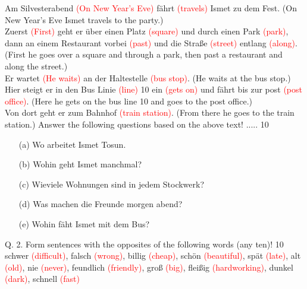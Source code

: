 \documentclass{article}
\begin{document}
Am Silvesterabend \textcolor{red}{(On New Year's Eve)} fährt \textcolor{red}{(travels)} Ismet zu dem Fest. (On New Year's Eve Ismet travels to the party.)\\
Zuerst \textcolor{red}{(First)} geht er über einen Platz \textcolor{red}{(square)} und durch einen Park \textcolor{red}{(park)}, dann an einem Restaurant vorbei \textcolor{red}{(past)} und die Straße \textcolor{red}{(street)} entlang \textcolor{red}{(along)}. (First he goes over a square and through a park, then past a restaurant and along the street.)\\
Er wartet \textcolor{red}{(He waits)} an der Haltestelle \textcolor{red}{(bus stop)}. (He waits at the bus stop.)\\
Hier steigt er in den Bus Linie \textcolor{red}{(line)} 10 ein \textcolor{red}{(gets on)} und fährt bis zur post \textcolor{red}{(post office)}. (Here he gets on the bus line 10 and goes to the post office.)\\
Von dort geht er zum Bahnhof \textcolor{red}{(train station)}. (From there he goes to the train station.)
Answer the following questions based on the above text! ..... 10
\begin{enumerate}
    \item[(a)] Wo arbeitet Ismet Tosun.
    \item[(b)] Wohin geht Ismet manchmal?
    \item[(c)] Wieviele Wohnungen sind in jedem Stockwerk?
    \item[(d)] Was machen die Freunde morgen abend?
    \item[(e)] Wohin fäht Ismet mit dem Bus?
\end{enumerate}
Q. 2. Form sentences with the opposites of the following words (any ten)! 10 \\
schwer \textcolor{red}{(difficult)}, falsch \textcolor{red}{(wrong)}, billig \textcolor{red}{(cheap)}, schön \textcolor{red}{(beautiful)}, spät \textcolor{red}{(late)}, alt \textcolor{red}{(old)}, nie \textcolor{red}{(never)}, feundlich \textcolor{red}{(friendly)}, groß \textcolor{red}{(big)}, fleißig \textcolor{red}{(hardworking)}, dunkel \textcolor{red}{(dark)}, schnell \textcolor{red}{(fast)}
\end{document}
